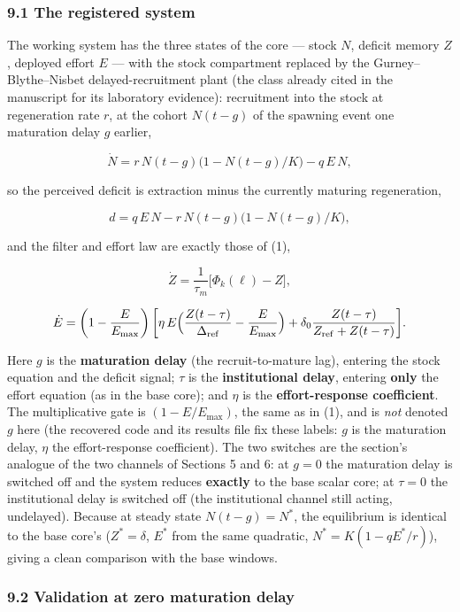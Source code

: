\documentclass[11pt]{article}
\begin{document}
\subsubsection{9.1 The registered system}\label{the-registered-system}

The working system has the three states of the core --- stock \(N\),
deficit memory \(Z\), deployed effort \(E\) --- with the stock
compartment replaced by the Gurney--Blythe--Nisbet delayed-recruitment
plant (the class already cited in the manuscript for its laboratory
evidence): recruitment into the stock at regeneration rate \(r\), at the
cohort \(N(t-g)\) of the spawning event one maturation delay \(g\)
earlier,

\[\dot N = r\,N(t-g)\bigl(1-N(t-g)/K\bigr) - q\,E\,N,\]

so the perceived deficit is extraction minus the currently maturing
regeneration,

\[d = q\,E\,N - r\,N(t-g)\bigl(1-N(t-g)/K\bigr),\]

and the filter and effort law are exactly those of (1),

\[\dot Z = \frac{1}{\tau_m}\bigl[\Phi_k(\ell)-Z\bigr],\]

\[\dot E = \left(1-\frac{E}{E_{\max}}\right)\biggl[\eta\,E\Bigl(\frac{Z(t-\tau)}{\Delta_{\mathrm{ref}}}-\frac{E}{E_{\max}}\Bigr)+\delta_0\frac{Z(t-\tau)}{Z_{\mathrm{ref}}+Z(t-\tau)}\biggr].\]

Here \(g\) is the \textbf{maturation delay} (the recruit-to-mature lag),
entering the stock equation and the deficit signal; \(\tau\) is the
\textbf{institutional delay}, entering \textbf{only} the effort equation
(as in the base core); and \(\eta\) is the \textbf{effort-response
coefficient}. The multiplicative gate is \((1-E/E_{\max})\), the same as
in (1), and is \emph{not} denoted \(g\) here (the recovered code and its
results file fix these labels: \(g\) is the maturation delay, \(\eta\)
the effort-response coefficient). The two switches are the section's
analogue of the two channels of Sections 5 and 6: at \(g = 0\) the
maturation delay is switched off and the system reduces \textbf{exactly}
to the base scalar core; at \(\tau = 0\) the institutional delay is
switched off (the institutional channel still acting, undelayed).
Because at steady state \(N(t-g)=N^*\), the equilibrium is identical to
the base core's (\(Z^*=\delta\), \(E^*\) from the same quadratic,
\(N^*=K(1-qE^*/r)\)), giving a clean comparison with the base windows.

\subsubsection{9.2 Validation at zero maturation
delay}\label{validation-at-zero-maturation-delay}
\end{document}
